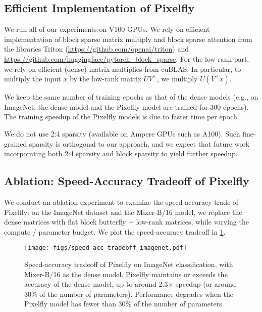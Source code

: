 \subsection{Efficient Implementation of Pixelfly}
\label{subsec:efficient_implementation}

We run all of our experiments on V100 GPUs.
We rely on efficient implementation of block sparse matrix multiply and block
sparse attention from the libraries Triton
(\url{https://github.com/openai/triton}) and
\url{https://github.com/huggingface/pytorch_block_sparse}.
For the low-rank part, we rely on efficient (dense) matrix multiplies from cuBLAS.
In particular, to multiply the input $x$ by the low-rank matrix $U V^\top$, we
multiply $U (V^\top x)$.

We keep the same number of training epochs as that of the dense models (e.g.,
on ImageNet, the dense model and the Pixelfly model are trained for 300 epochs).
The training speedup of the Pixelfly models is due to faster time per
epoch.

We do not use 2:4 sparsity (available on Ampere GPUs such as A100).
Such fine-grained sparsity is orthogonal to our approach, and we expect that
future work incorporating both 2:4 sparsity and block sparsity to yield further speedup.

\subsection{Ablation: Speed-Accuracy Tradeoff of Pixelfly}
\label{subsec:speed_accuracy_tradeoff}

We conduct an ablation experiment to examine the speed-accuracy trade of
Pixelfly: on the ImageNet dataset and the Mixer-B/16 model, we replace the dense
matrices with flat block butterfly + low-rank matrices, while varying the
compute / parameter budget.
We plot the speed-accuracy tradeoff in \cref{fig:speed_accuracy_tradeoff}.
\begin{figure}[ht]
  \centering
  \texttt{[image: figs/speed\_acc\_tradeoff\_imagenet.pdf]}
  \caption{\label{fig:speed_accuracy_tradeoff}Speed-accuracy tradeoff of Pixelfly on
    ImageNet classification, with Mixer-B/16 as the dense model. Pixelfly
    maintains or exceeds the accuracy of the dense model, up to around
    2.3$\times$ speedup (or around 30\% of the number of parameters).
    Performance degrades when the Pixelfly model has fewer than 30\% of the number
    of parameters.}
\end{figure}

